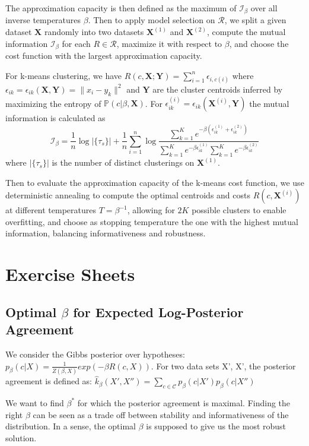 \documentclass[9pt,parskip]{scrartcl}
\begin{document}
\begin{multicols*}{4}
The approximation capacity is then defined as the maximum of $\mathcal{I}_\beta$ over all inverse temperatures $\beta$. Then to apply model selection on $\mathcal{R}$, we split a given dataset $\mathbf{X}$ randomly into two datasets $\mathbf{X}^{(1)}$ and $\mathbf{X}^{(2)}$, compute the mutual information $\mathcal{I}_\beta$ for each $R \in \mathcal{R}$, maximize it with respect to $\beta$, and choose the cost function with the largest approximation capacity.

For k-means clustering, we have $R(c, \mathbf{X}; \mathbf{Y}) = \sum_{i=1}^n \epsilon_{i,c(i)}$ where $\epsilon_{ik} = \epsilon_{ik}(\mathbf{X}, \mathbf{Y}) = \|x_i - y_k\|^2$ and $\mathbf{Y}$ are the cluster centroids inferred by maximizing the entropy of $\mathbb{P}(c|\beta, \mathbf{X})$. For $\epsilon^{(i)}_{ik} = \epsilon_{ik}(\mathbf{X}^{(i)}, \mathbf{Y})$ the mutual information is calculated as
$$\mathcal{I}_\beta = \frac{1}{n} \log |\{\tau_s\}| + \frac{1}{n} \sum_{i=1}^n \log \frac{\sum_{k=1}^K e^{-\beta(\epsilon^{(1)}_{ik}+\epsilon^{(2)}_{ik})}}{\sum_{k=1}^K e^{-\beta\epsilon^{(1)}_{ik}} \sum_{k=1}^K e^{-\beta\epsilon^{(2)}_{ik}}}$$
where $|\{\tau_s\}|$ is the number of distinct clusterings on $\mathbf{X}^{(1)}$. 

Then to evaluate the approximation capacity of the k-means cost function, we use deterministic annealing to compute the optimal centroids and costs $R(c, \mathbf{X}^{(i)})$ at different temperatures $T = \beta^{-1}$, allowing for $2K$ possible clusters to enable overfitting, and choose as stopping temperature the one with the highest mutual information, balancing informativeness and robustness.

\section*{Exercise Sheets}
\subsection*{Optimal $\beta$ for Expected Log-Posterior Agreement}

We consider the Gibbs posterior over hypotheses:
$p_{\beta}(c|X) = \frac{1}{Z(\beta, X)}exp(-\beta R(c,X))$.
For two data sets X', X', the posterior agreement is defined as: 
$\hat k_{\beta}(X',X'') = \sum_{c \in \mathcal{C}}p_{\beta}(c|X')p_{\beta}(c|X'')$
\end{multicols*}

We want to find $\beta^*$ for which the posterior agreement is maximal. Finding the right $\beta$ can be seen as a trade off between stability and informativeness of the distribution. 
In a sense, the optimal $\beta$ is supposed to give us the most robust solution.
\end{document}
